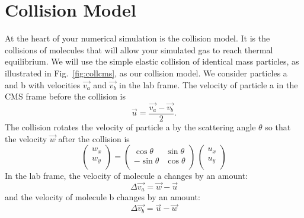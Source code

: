 \section{Collision Model}

At the heart of your numerical simulation is the collision model.  It
is the collisions of molecules that will allow your simulated gas to
reach thermal equilibrium.  We will use the simple elastic collision
of identical mass particles, as illustrated in Fig.~\ref{fig:collcms}, as our collision model.  We consider particles a and b with velocities $\vec{v_a}$ and
$\vec{v_b}$ in the lab frame.  The velocity of particle a in the CMS frame before the collision is
\begin{displaymath}
\vec{u} = \frac{\vec{v_a} - \vec{v_b}}{2}.
\end{displaymath}
The collision rotates the velocity of particle a by the scattering angle $\theta$ so that the velocity $\vec{w}$ after the collision is
\begin{displaymath}
\begin{pmatrix}
w_x \\
w_y \\
\end{pmatrix}
  =
\begin{pmatrix}
\cos \theta  & \sin \theta \\
-\sin \theta  & \cos \theta \\
\end{pmatrix}
\,
\begin{pmatrix}
u_x \\
u_y \\
\end{pmatrix}
\end{displaymath}
In the lab frame, the velocity of molecule a changes by an amount:
\begin{displaymath}
\Delta \vec{v_a} = \vec{w} - \vec{u}
\end{displaymath}
and the velocity of molecule b changes by an amount:
\begin{displaymath}
\Delta \vec{v_b} = \vec{u} - \vec{w}
\end{displaymath}




